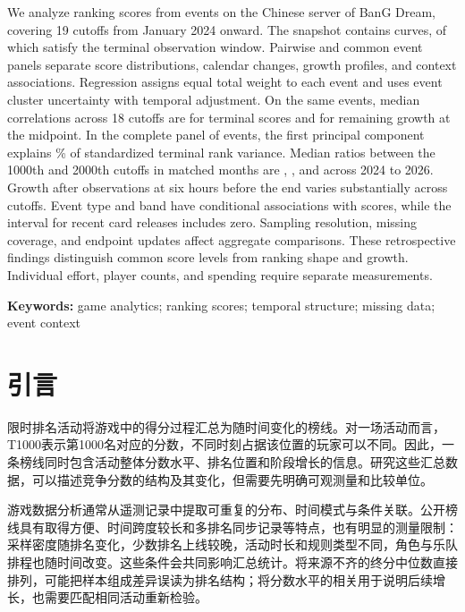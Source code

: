 \documentclass[preprint,12pt]{elsarticle}
\begin{document}
We analyze ranking scores from \NumEvents{} events on the Chinese server of BanG Dream, covering 19 cutoffs from January 2024 onward. The snapshot contains \NumSourceCurves{} curves, of which \NumValidCurves{} satisfy the terminal observation window. Pairwise and common event panels separate score distributions, calendar changes, growth profiles, and context associations. Regression assigns equal total weight to each event and uses event cluster uncertainty with temporal adjustment. On the same \NumCorrelationEvents{} events, median correlations across 18 cutoffs are \RhoFinal{} for terminal scores and \RhoGrowth{} for remaining growth at the midpoint. In the complete panel of \NumCoreEvents{} events, the first principal component explains \PcaFirst{}\% of standardized terminal rank variance. Median ratios between the 1000th and 2000th cutoffs in matched months are \RatioYearFirst{}, \RatioYearSecond{}, and \RatioYearThird{} across 2024 to 2026. Growth after observations at six hours before the end varies substantially across cutoffs. Event type and band have conditional associations with scores, while the interval for recent card releases includes zero. Sampling resolution, missing coverage, and endpoint updates affect aggregate comparisons. These retrospective findings distinguish common score levels from ranking shape and growth. Individual effort, player counts, and spending require separate measurements.

\noindent\textbf{Keywords:} game analytics; ranking scores; temporal structure; missing data; event context

\section{引言}

限时排名活动将游戏中的得分过程汇总为随时间变化的榜线。对一场活动而言，T1000表示第1000名对应的分数，不同时刻占据该位置的玩家可以不同。因此，一条榜线同时包含活动整体分数水平、排名位置和阶段增长的信息。研究这些汇总数据，可以描述竞争分数的结构及其变化，但需要先明确可观测量和比较单位。

游戏数据分析通常从遥测记录中提取可重复的分布、时间模式与条件关联\citep{seif2013analytics,drachen2013mining}。公开榜线具有取得方便、时间跨度较长和多排名同步记录等特点，也有明显的测量限制：采样密度随排名变化，少数排名上线较晚，活动时长和规则类型不同，角色与乐队排程也随时间改变。这些条件会共同影响汇总统计。将来源不齐的终分中位数直接排列，可能把样本组成差异误读为排名结构；将分数水平的相关用于说明后续增长，也需要匹配相同活动重新检验。
\end{document}

